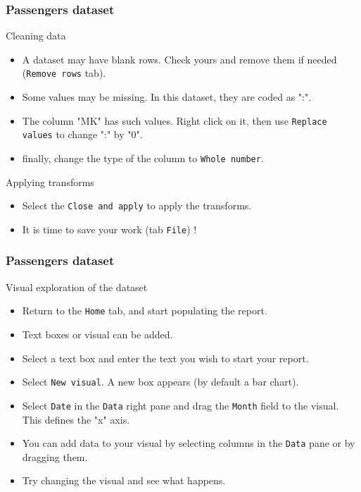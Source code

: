 \documentclass[main.tex]{subfiles}
\begin{document}
\begin{frame}
    \frametitle{Passengers dataset}
\begin{block}{Cleaning data}
    \begin{itemize}
        \item<+-> A dataset may have blank rows. Check yours and remove
        them if needed (\texttt{Remove rows} tab).
        \item<+-> Some values may be missing. In this dataset, they are coded 
        as ":". 
        \item<+-> The column "MK" has such values. Right click on it, then use 
        \texttt{Replace values} to change ":" by "0".
        \item<+-> finally, change the type of the column to \texttt{Whole number}.
    \end{itemize}
\end{block}    
   \begin{block}{Applying transforms}
    \begin{itemize}
        \item<+-> Select the \texttt{Close and apply} to apply the transforms.
        \item<+-> It is time to save your work (tab \texttt{File}) ! 
    \end{itemize}
   \end{block} 
\end{frame}
\begin{frame}
    \frametitle{Passengers dataset}
\begin{block}{Visual exploration of the dataset}
    \begin{itemize}
        \item<+-> Return to the \texttt{Home} tab, and start populating the report.
        \item<+-> Text boxes or visual can be added. 
        \item<+-> Select a text box and enter the text you wish to start your report.
        \item<+-> Select \texttt{New visual}. A new box appears (by default a bar chart).
        \item<+-> Select \texttt{Date} in the \texttt{Data} right pane and drag 
        the \texttt{Month} field to the visual. This defines the "x" axis.
        \item<+-> You can add data to your visual by selecting columns in the \texttt{Data} pane 
        or by dragging them. 
        \item<+-> Try changing the visual and see what happens.
    \end{itemize}
\end{block}
\end{frame}
\end{document}
